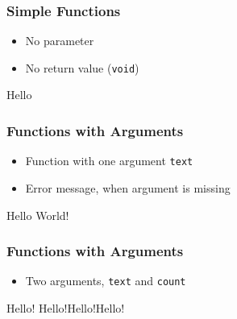 \documentclass[ngerman]{beamer}
\newcommand{\ta}[1]{\textattachfile[color=1 0 0]{#1}{Code}}
\begin{document}
\begin{frame}[containsverbatim]
\frametitle{Simple Functions}

\begin{itemize}
	\item No parameter
	\item No return value (\texttt{void})
\end{itemize}



\begin{ausgabe}
Hello
\end{ausgabe}

\end{frame}



\begin{frame}[containsverbatim]
\frametitle{Functions with Arguments}

\begin{itemize}
	\item Function with one argument \texttt{text} 
	\item Error message, when argument is missing
\end{itemize}



\begin{ausgabe}
Hello World!
\end{ausgabe}


\end{frame}

\begin{frame}[containsverbatim]
\frametitle{Functions with Arguments}

\begin{itemize}
	\item Two arguments, \texttt{text} and \texttt{count}
\end{itemize}



\begin{ausgabe}

Hello!
Hello!Hello!Hello!

\end{ausgabe}

\end{frame}
\end{document}
